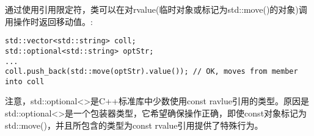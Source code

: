 通过使用引用限定符，类可以在对rvalue(临时对象或标记为std::move()的对象)调用操作时返回移动值。:\par

\begin{lstlisting}[caption={}]
std::vector<std::string> coll;
std::optional<std::string> optStr;
...
coll.push_back(std::move(optStr).value()); // OK, moves from member into coll
\end{lstlisting}

注意，std::optional<>是C++标准库中少数使用const ravlue引用的类型。原因是std::optional<>是一个包装器类型，它希望确保操作正确，即使const对象标记为std::move()，并且所包含的类型为const rvalue引用提供了特殊行为。\par

















